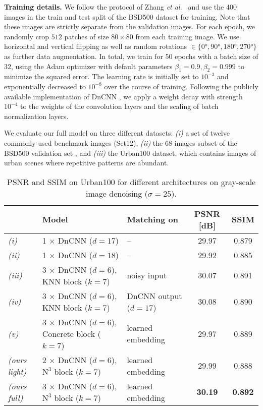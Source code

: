 \documentclass{article}
\makeatletter
\newcommand{\etal}{\emph{et al.}\@\xspace}
\newcommand{\myparagraph}[1]{\smallskip\noindent\textbf{#1}}
\newcommand\nnn{\text{N}^3}
\makeatother
\begin{document}
\myparagraph{Training details.}
We follow the protocol of Zhang \etal~\cite{Zhang:2017:BGD} and use the 400 images in the train and test split of the BSD500 dataset for training. 
Note that these images are strictly separate from the validation images. 
For each epoch, we randomly crop $512$ patches of size $80\times80$ from each training image. 
We use horizontal and vertical flipping as well as random rotations $\in \{\ang{0}, \ang{90}, \ang{180}, \ang{270}\}$ as further
data augmentation. 
In total, we train for $50$ epochs with a batch size of $32$,
using the Adam optimizer \cite{Kingma:2014:ADAM} with default parameters
$\beta_1=0.9, \beta_2=0.999$ to minimize the squared error. 
The learning rate is initially set to $10^{-3}$ and exponentially decreased to
$10^{-8}$ over the course of training. 
Following the publicly available implementation of DnCNN \cite{Zhang:2017:BGD},
we apply a weight decay with strength $10^{-4}$ to the weights of the
convolution layers and the scaling of batch normalization layers.

We evaluate our full model on three different datasets:
\emph{(i)} a set of twelve commonly used benchmark images (Set12),
\emph{(ii)} the 68 images subset \cite{Roth:2009:FEF} of the
BSD500 validation set \cite{Martin:2001:BDB}, and
\emph{(iii)} the Urban100 \cite{Huang:2015:SelfEx} dataset, which contains images of urban scenes where repetitive patterns are abundant.

\begin{table*}[tb]
	\caption{PSNR and SSIM \cite{Wang:2003:MSS} on Urban100 for different architectures on gray-scale image denoising ($\sigma{=}25$).}
	\label{tab:ablation_urban_sigma25}
	\footnotesize
	\centering
	\smallskip
	\begin{tabularx}{\linewidth}{@{}l X l S[table-format=2.2] S[table-format=1.3]@{}}
		\toprule
		& Model							& Matching on 	&  {PSNR [dB]}	& {SSIM}	\\ 		\midrule
		\emph{(i)}& 1 $\times$ DnCNN ($d{=}17$)						& {--}						&  29.97		&  0.879 \\ 		\emph{(ii)}& 1 $\times$ DnCNN ($d{=}18$)						& {--}						&  29.92		&  0.885 \\ 						\emph{(iii)}& 3 $\times$ DnCNN ($d{=}6$), KNN block ($k{=}7$)	& noisy input			&  30.07		& 0.891 \\
		\emph{(iv)}& 3 $\times$ DnCNN ($d{=}6$), KNN block ($k{=}7$)	& DnCNN output ($d{=}17$)	&  30.08		& 0.890 \\
		\emph{(v)}& 3 $\times$ DnCNN ($d{=}6$), Concrete block ($k{=}7$)	& learned embedding	&  29.97 		&  0.889 \\
		\midrule
		\emph{(ours light)}& 2 $\times$ DnCNN ($d{=}6$), $\nnn$ block ($k{=}7$)	& learned embedding & 29.99 		& 0.888 \\
		\emph{(ours full)}& 3 $\times$ DnCNN ($d{=}6$), $\nnn$ block ($k{=}7$)	& learned embedding & \bfseries 30.19 		& \bfseries 0.892 \\
		\bottomrule
	\end{tabularx}
\end{table*}
\end{document}

